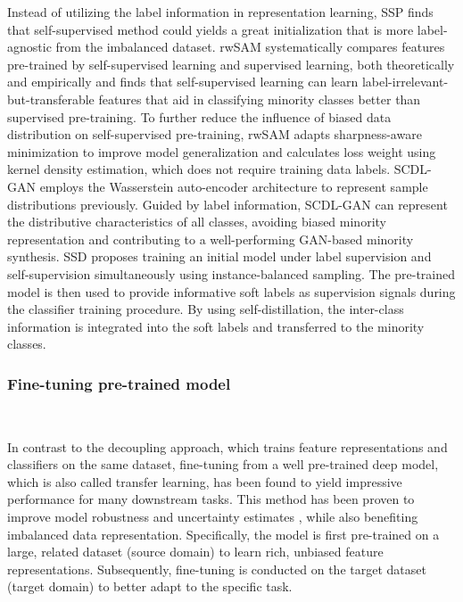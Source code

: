 Instead of utilizing the label information in representation learning, SSP \cite{yang2020rethinking} finds that self-supervised method could yields a great initialization that is more label-agnostic from the imbalanced dataset.  
rwSAM \cite{liuself} systematically compares features pre-trained by self-supervised learning and supervised learning, both theoretically and empirically and finds that self-supervised learning can learn label-irrelevant-but-transferable features that aid in classifying minority classes better than supervised pre-training. To further reduce the influence of biased data distribution on self-supervised pre-training, rwSAM adapts sharpness-aware minimization to improve model generalization and calculates loss weight using kernel density estimation, which does not require training data labels.
SCDL-GAN \cite{cai2019supervised} employs the Wasserstein auto-encoder architecture to represent sample distributions previously. Guided by label information, SCDL-GAN can represent the distributive characteristics of all classes, avoiding biased minority representation and contributing to a well-performing GAN-based minority synthesis.
SSD \cite{li2021self} proposes training an initial model under label supervision and self-supervision simultaneously using instance-balanced sampling. The pre-trained model is then used to provide informative soft labels as supervision signals during the classifier training procedure. By using self-distillation, the inter-class information is integrated into the soft labels and transferred to the minority classes.





\subsubsection{Fine-tuning pre-trained model}\
\label{s332}

In contrast to the decoupling approach, which trains feature representations and classifiers on the same dataset, fine-tuning from a well pre-trained deep model, which is also called transfer learning, has been found to yield impressive performance for many downstream tasks. This method has been proven to improve model robustness and uncertainty estimates \cite{hendrycks2019using}, while also benefiting imbalanced data representation. Specifically, the model is first pre-trained on a large, related dataset (source domain) to learn rich, unbiased feature representations. Subsequently, fine-tuning is conducted on the target dataset (target domain) to better adapt to the specific task.

